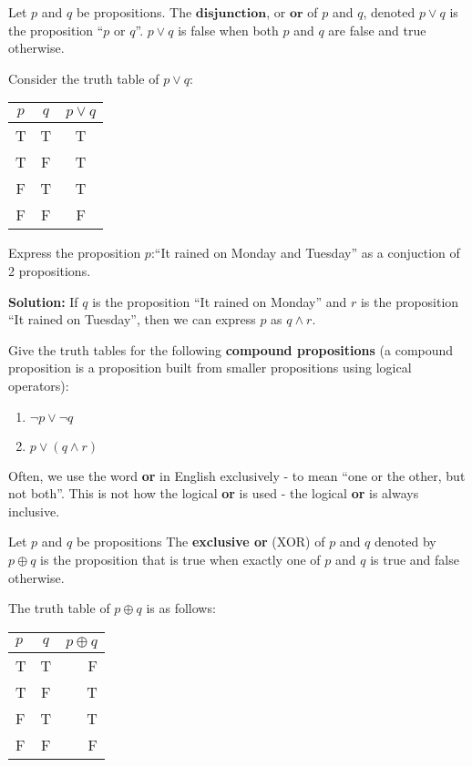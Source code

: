 \begin{defn}
  Let $p$ and $q$ be propositions. The $\textbf{disjunction}$, or
  $\textbf{or}$ of $p$ and $q$, denoted $p\vee q$ is the proposition ``$p$
  or $q$''. $p\vee q$ is false when both $p$ and $q$ are false and true
  otherwise.
\end{defn}

Consider the truth table of $p\vee q$:
\begin{table}[h] \centering
  \begin{tabular}{cc|c}
    $p$ & $q$ & $p\vee q$ \\\hline
    T & T & T \\
    T & F & T \\
    F & T & T \\
    F & F & F
  \end{tabular}
\end{table}

\begin{example}
  Express the proposition $p$:``It rained on Monday and Tuesday'' as a
  conjuction of 2 propositions.

  \textbf{Solution:} If $q$ is the proposition ``It rained on
  Monday'' and $r$ is the proposition ``It rained on Tuesday'', then we can
  express $p$ as $q\wedge r$.
\end{example}

\begin{exercise}
  Give the truth tables for the following \textbf{compound propositions}
  (a compound proposition is a proposition built from smaller propositions
  using logical operators):
  \begin{enumerate}
  \item $\neg p\vee \neg q$
  \item $p \vee (q \wedge r)$
  \end{enumerate}
\end{exercise}

Often, we use the word \textbf{or} in English exclusively - to mean ``one or the other, but not both''. This is not how the logical \textbf{or} is used - the logical \textbf{or} is always inclusive.

\begin{defn}
  Let $p$ and $q$ be propositions The \textbf{exclusive or} (XOR) of $p$
  and $q$ denoted by $p\oplus q$ is the proposition that is true when
  exactly one of $p$ and $q$ is true and false otherwise.
\end{defn}

The truth table of $p\oplus q$ is as follows:
\begin{table}[h] \centering
  \begin{tabular}{lc|r}
    $p$ & $q$ & $p\oplus q$ \\\hline
    T & T & F \\
    T & F & T \\
    F & T & T \\
    F & F & F
  \end{tabular}
\end{table}

